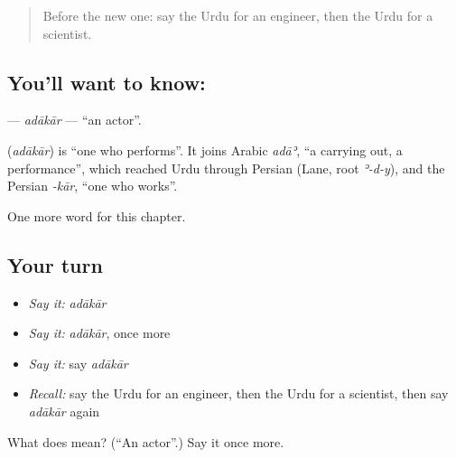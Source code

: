\label{lesson:UR-C262-adakar}



\begin{quote}
Before the new one: say the Urdu for an engineer, then the Urdu for a scientist.
\end{quote}

\subsection*{You'll want to know: }
\textbf{} — \emph{adākār} — \textquotedblleft{}an actor\textquotedblright{}.

\begin{cousinweb}
\textbf{} (\emph{adākār}) is \textquotedblleft{}one who performs\textquotedblright{}. It joins Arabic \emph{adāʾ}, \textquotedblleft{}a carrying out, a performance\textquotedblright{}, which reached Urdu through Persian (Lane, root \emph{ʾ-d-y}), and the Persian \emph{-kār}, \textquotedblleft{}one who works\textquotedblright{}.
\end{cousinweb}

\begin{grammarlens}[title={What you've built}]
One more word for this chapter.
\end{grammarlens}

\subsection*{Your turn}
\begin{itemize}
\raggedright
  \item \emph{Say it:} \emph{adākār}
  \item \emph{Say it:} \emph{adākār}, once more
  \item \emph{Say it:} say \emph{adākār}
  \item \emph{Recall:} say the Urdu for an engineer, then the Urdu for a scientist, then say \emph{adākār} again
\end{itemize}

\begin{tcolorbox}[breakable,colback=teal!4,colframe=teal!35!black,title={Before you move on}]
What does  mean? (\textquotedblleft{}An actor\textquotedblright{}.) Say it once more.
\end{tcolorbox}
